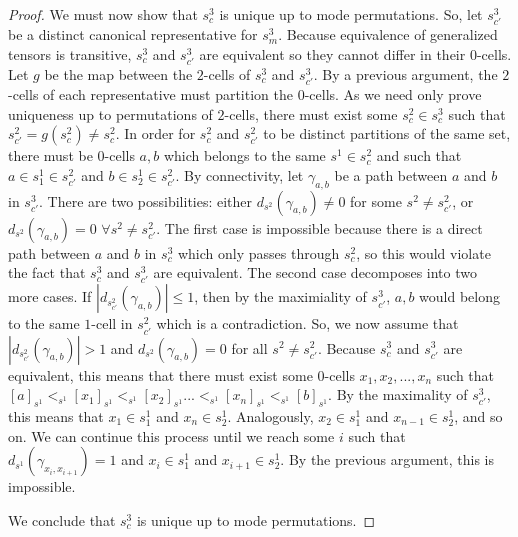 \documentclass[10pt,a4paper]{amsart}
\begin{document}
\begin{proof}
	We must now show that $s^3_c$ is unique up to mode permutations. So, let $s^3_{c'}$ be a distinct canonical representative for $s^3_m$. Because equivalence of generalized tensors is transitive, $s^3_c$ and $s^3_{c'}$ are equivalent so they cannot differ in their $0$-cells. Let $g$ be the map between the $2$-cells of $s^3_c$ and $s^3_{c'}$. By a previous argument, the $2$-cells of each representative must partition the $0$-cells. As we need only prove uniqueness up to permutations of $2$-cells, there must exist some $s^2_c \in s^3_c$ such that $s^2_{c'} = g(s^2_c) \neq s^2_c$. In order for $s^2_c$ and $s^2_{c'}$ to be distinct partitions of the same set, there must be $0$-cells $a, b$ which belongs to the same $s^1 \in s^2_c$ and such that $a \in s^1_1 \in s^2_{c'}$ and $b \in s^1_2 \in s^2_{c'}$. By connectivity, let $\gamma_{a, b}$ be a path between $a$ and $b$ in $s^3_{c'}$. There are two possibilities: either $d_{s^2}(\gamma_{a, b}) \neq 0$ for some $s^2 \neq s^2_{c'}$, or $d_{s^2}(\gamma_{a, b}) = 0$ $\forall s^2 \neq s^2_{c'}$. The first case is impossible because there is a direct path between $a$ and $b$ in $s^3_c$ which only passes through $s^2_c$, so this would violate the fact that $s^3_c$ and $s^3_{c'}$ are equivalent. The second case decomposes into two more cases. If $|d_{s^2_{c'}}(\gamma_{a, b})| \leq 1$, then by the maximiality of $s^3_{c'}$, $a, b$ would belong to the same $1$-cell in $s^2_{c'}$ which is a contradiction. So, we now assume that $|d_{s^2_{c'}}(\gamma_{a, b})| > 1$ and $d_{s^2}(\gamma_{a, b}) = 0$ for all $s^2 \neq s^2_{c'}$. Because $s^3_c$ and $s^3_{c'}$ are equivalent, this means that there must exist some $0$-cells $x_1, x_2, ..., x_n$ such that $[a]_{s^1} <_{s^1} [x_1]_{s^1} <_{s^1} [x_2]_{s^1} ... <_{s^1} [x_n]_{s^1} <_{s^1} [b]_{s^1}$. By the maximality of $s^3_{c'}$, this means that $x_1 \in s^1_1$ and $x_n \in s^1_2$. Analogously, $x_2 \in s^1_1$ and $x_{n-1} \in s^1_2$, and so on. We can continue this process until we reach some $i$ such that $d_{s^1}(\gamma_{x_i, x_{i+1}}) = 1$ and $x_i \in s^1_1$ and $x_{i+1} \in s^1_2$. By the previous argument, this is impossible.
	
	We conclude that $s^3_c$ is unique up to mode permutations.
\end{proof}
\end{document}
